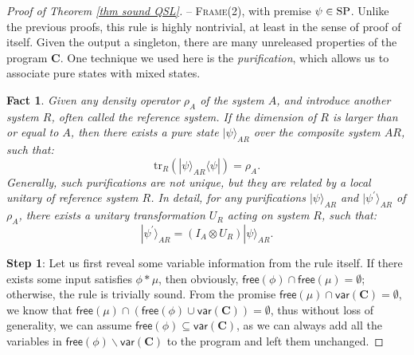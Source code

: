 \documentclass[conference,compsoc, 10pt]{IEEEtran}
\newtheorem{fact}{Fact}
\newcommand {\cD } {{\mathcal{D}}}
\newcommand {\cE } {{\mathcal{E}}}
\newcommand {\cI } {{\mathcal{I}}}
\newcommand {\id } {{I}}
\newcommand {\free }[1] {{\mathsf{free}\left(#1\right)}}
\newcommand {\rt }[2] {{\left.{#1}\right|_{#2}}}
\newcommand {\tr } {{\mathrm{tr}}}
\newcommand {\vars } {\mathbf{V}}
\newcommand {\var } {\mathsf{var}}
\newcommand {\unia } {{\mathbf{U}}}
\newcommand {\prog } {{\mathbf{C}}}
\newcommand {\sem}[1] {\llbracket#1\rrbracket}
\def\>{\ensuremath{\rangle}}
\def\<{\ensuremath{\langle}}
\begin{document}
\begin{appendices}
\begin{proof}[Proof of Theorem \ref{thm sound QSL}]
			
			
			\vspace{0.4cm}
			
			\noindent -- \textsc{Frame}(2), with premise $\psi\in{\rm SP}$. Unlike the previous proofs, this rule is highly nontrivial, at least in the sense of proof of itself. Given the output a singleton, there are many unreleased properties of the program $\prog$. One technique we used here is the \emph{purification}, which allows us to associate pure states with mixed states. 
			
			\begin{fact}
				Given any density operator $\rho_A$ of the system $A$, and introduce another system $R$, often called the reference system. If the dimension of $R$ is larger than or equal to $A$, then there exists a pure state $|\psi\>_{AR}$ over the composite system $AR$, such that:
				$$\tr_R(|\psi\>_{AR}\<\psi|) = \rho_A.$$
				Generally, such purifications are not unique, but they are related by a local unitary of reference system $R$. In detail, for any purifications $|\psi\>_{AR}$ and $|\psi^\prime\>_{AR}$ of $\rho_A$, there exists a unitary transformation $U_R$ acting on system $R$, such that:
				$$|\psi^\prime\>_{AR} = (\id_A\otimes U_R)|\psi\>_{AR}.$$
			\end{fact}
			
			\noindent\textbf{Step 1}: Let us first reveal some variable information from the rule itself. If there exists some input satisfies $\phi\ast\mu$, then obviously, $\free{\phi}\cap\free{\mu} = \emptyset$; otherwise, the rule is trivially sound. From the promise $\free{\mu}\cap\var(\prog) = \emptyset$, we know that $\free{\mu}\cap(\free{\phi}\cup\var(\prog)) = \emptyset$, thus without loss of generality, we can assume $\free{\phi}\subseteq\var(\prog)$, as we can always add all the variables in $\free{\phi}\backslash\var(\prog)$ to the program and left them unchanged.
			

\end{proof}
\end{appendices}
\end{document}
